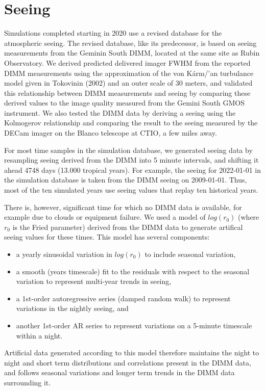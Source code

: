 \section{Seeing}

Simulations completed starting in 2020 use a revised database for the
atmospheric seeing. The revised database, like its predecessor, is
based on seeing measurements from the Geminin South DIMM, located at
the same site as Rubin Observatory. We derived predicted delivered
imager FWHM from the reported DIMM measurements using the
approximation of the von K\'arm/'an turbulance model given in
Tokovinin (2002) and an outer scale of 30 meters, and validated this
relationship between DIMM measurements and seeing by comparing these
derived values to the image quality measured from the Gemini South
GMOS instrument. We also tested the DIMM data by deriving a seeing
using the Kolmogerov relationship and comparing the result to the
seeing measured by the DECam imager on the Blanco telescope at CTIO, a
few miles away.

For most time samples in the simulation database, we generated seeing
data by resampling seeing derived from the DIMM into 5 minute
intervals, and shifting it ahead 4748 days (13.000 tropical years). For
example, the seeing for 2022-01-01 in the simulation database is taken
from the DIMM seeing on 2009-01-01. Thus, most of the ten simulated
years use seeing values that replay ten historical years.

There is, however, significant time for which no DIMM data is available, for
example due to clouds or equipment failure. We used a model of
$log(r_{0})$ (where $r_{0}$ is the Fried parameter) derived
from the DIMM data to generate artifical seeing values for these
times. This model has several components:
\begin{itemize}
  \item a yearly sinusoidal variation in $log(r_{0})$ to include
    seasonal variation,
  \item a smooth (years timescale) fit to the residuals with respect
    to the seasonal variation to represent multi-year trends in
    seeing,
  \item a 1st-order autoregressive series (damped random walk) to
    represent variations in the nightly seeing, and
  \item another 1st-order AR series to represent variations on a
    5-minute timescale within a night.
\end{itemize}
Artificial data generated according to this model therefore maintains
the night to night and short term distributions and correlations
present in the DIMM data, and follows seasonal variations and longer
term trends in the DIMM data surrounding it. 
